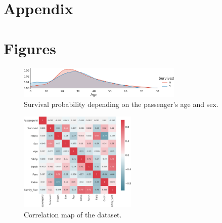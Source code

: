 \section*{Appendix}
\section{Figures}
 \begin{figure}[h]
 \centering
     \includegraphics[width=0.7\textwidth]{media_saved/age_all}
     \caption{Survival probability depending on the passenger's age and sex.}
     \label{fig:agesexfeat}
\end{figure}
\begin{figure}[h]
\centering
\includegraphics[width=0.5\textwidth]{media_saved/correlation_map}
     \caption{Correlation map of the dataset.}
     \label{fig:correlationmap}
\end{figure}

\newpage

